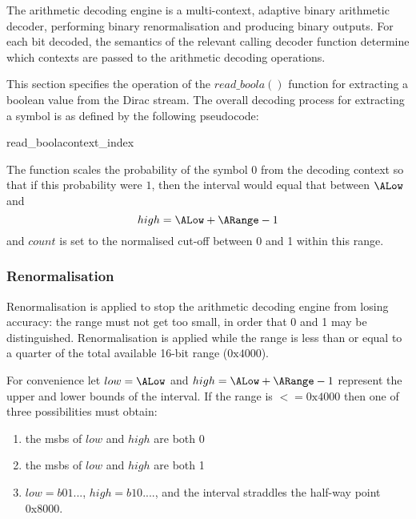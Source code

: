The arithmetic decoding engine is a multi-context, adaptive binary
arithmetic decoder, performing binary renormalisation and producing
binary outputs. For each bit decoded, the semantics of the relevant
calling decoder function determine which contexts are passed to the
arithmetic decoding operations. 

This section specifies the operation of the $read\_boola()$ function
for extracting a boolean value from the Dirac stream. The overall decoding
process for extracting a symbol is as defined by the following
pseudocode:

\begin{pseudo}{read\_boola}{context\_index}
\bsELSE
\bsEND
{}
\bsEND
{}
\end{pseudo}

\begin{informative}
The function scales the probability of the symbol $0$ from the decoding context
so that if this probability were $1$, then the interval would equal that between
 $\ALow$ and 
 \[high=\ALow+\ARange-1\]
and $count$ is set to the normalised cut-off between 0 and 1 within this range.
\end{informative}

\subsubsection{Renormalisation}
\label{renormalisation}

Renormalisation is applied to stop the arithmetic decoding 
engine from losing accuracy: the range must not get too small,
 in order that 0 and 1 may be distinguished. Renormalisation is
 applied while the range is less than or equal to a quarter of 
 the total available 16-bit range ($\text{0x4000}$). 

For convenience let $low=\ALow$ and $high=\ALow+\ARange-1$ 
represent the upper and lower bounds of the interval. If the
range is $<=\text{0x4000}$ then
one of three possibilities must obtain:
\begin{enumerate}
\item the msbs of $low$ and $high$ are both 0
\item the msbs of $low$ and $high$ are both 1
\item $low=b01...$, $high=b10....$,  and the interval straddles the half-way point 0x8000. 
\end{enumerate}

